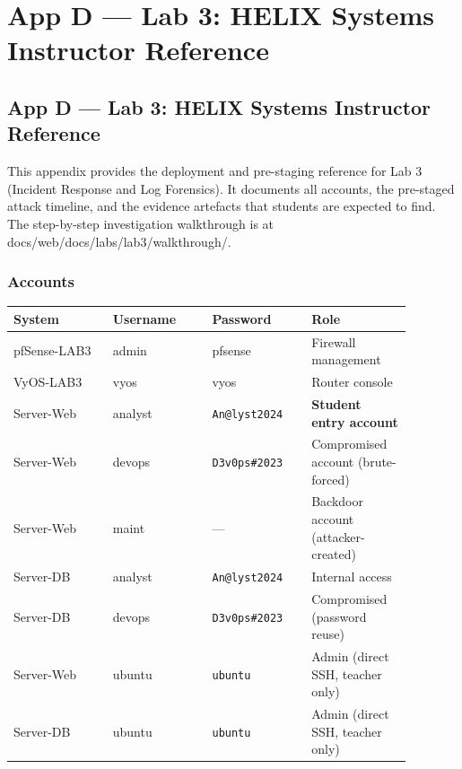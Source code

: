 \chapter{App D --- Lab 3: HELIX Systems Instructor Reference}

\section{App D --- Lab 3: HELIX Systems Instructor Reference}

This appendix provides the deployment and pre-staging reference for Lab 3 (Incident Response and Log Forensics). It documents all accounts, the pre-staged attack timeline, and the evidence artefacts that students are expected to find. The step-by-step investigation walkthrough is at docs/web/docs/labs/lab3/walkthrough/.

\subsection{Accounts}

{\footnotesize\begin{longtable}[]{@{}
  >{\raggedright\arraybackslash}p{0.22\linewidth}
  >{\raggedright\arraybackslash}p{0.22\linewidth}
  >{\raggedright\arraybackslash}p{0.22\linewidth}
  >{\raggedright\arraybackslash}p{0.22\linewidth}@{}}
\toprule\noalign{}
\begin{minipage}[b]{\linewidth}\raggedright
\textbf{System}
\end{minipage} & \begin{minipage}[b]{\linewidth}\raggedright
\textbf{Username}
\end{minipage} & \begin{minipage}[b]{\linewidth}\raggedright
\textbf{Password}
\end{minipage} & \begin{minipage}[b]{\linewidth}\raggedright
\textbf{Role}
\end{minipage} \\
\midrule\noalign{}
\endhead
\bottomrule\noalign{}
\endlastfoot
pfSense-LAB3 & admin & pfsense & Firewall management \\
VyOS-LAB3 & vyos & vyos & Router console \\
Server-Web & analyst & \texttt{An@lyst2024} & \textbf{Student entry account} \\
Server-Web & devops & \texttt{D3v0ps\#2023} & Compromised account (brute-forced) \\
Server-Web & maint & --- & Backdoor account (attacker-created) \\
Server-DB & analyst & \texttt{An@lyst2024} & Internal access \\
Server-DB & devops & \texttt{D3v0ps\#2023} & Compromised (password reuse) \\
Server-Web & ubuntu & \texttt{ubuntu} & Admin (direct SSH, teacher only) \\
Server-DB & ubuntu & \texttt{ubuntu} & Admin (direct SSH, teacher only) \\
\end{longtable}}

